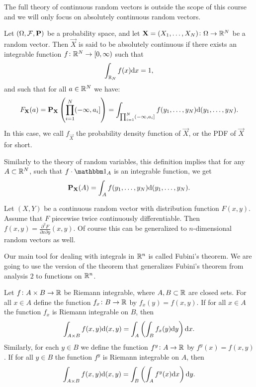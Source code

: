 \documentclass[11pt,a4paper]{article}
\begin{document}
\begin{remark}
  The full theory of continuous random vectors is outside the scope of this
  course and we will only focus on absolutely continuous random vectors.
\end{remark}

\begin{definition}
  Let $(\Omega, \mathcal F, \mathbf{P})$ be a probability space, 
  and let $\boldsymbol{\mathbf{X}} = (X_1,\dots,X_N) \colon \Omega \to \mathbb{R}^N$ be a random vector.
  Then $\vec{X}$ is said to be absolutely continuous if there
  exists an integrable 
  function $f \colon \mathbb{R}^N \to [0,\infty)$ such that 
  \[
    \int_{\R_N} f(x) \dx = 1,
  \]
  and such that for all $a \in \mathbb{R}^N$ we have:
  \[
    F_{\boldsymbol{\mathbf{X}}}(a) = 
    \mathbf{P}_{\boldsymbol{\mathbf{X}}}\left(\prod_{i=1}^{N} (-\infty,a_i]\right) =
    \int_{\prod_{i=1}^{N} (-\infty,a_i]} f(y_1,\dots,y_N)\mathrm{d} (y_1,\dots,y_N).
  \]
  In this case, we call $f_{\vec{X}}$ the probability density function of 
  $\vec{X}$, or the PDF of $\vec X$ for short.
\end{definition}

\begin{remark}
  Similarly to the theory of random variables,
  this definition implies that for any $A \subset \mathbb{R}^N$,
  such that $f \cdot \ind_A$ is an integrable function,
  we get
  \[
    \mathbf{P}_{\boldsymbol{\mathbf{X}}}(A) = 
    \int_{A} f(y_1,\dots,y_N)\mathrm{d} (y_1,\dots,y_N).
  \]
\end{remark}

\begin{remark}
  Let $(X,Y)$ be a continuous random vector with distribution function $F(x,y)$.
  Assume that $F$ piecewise twice continuously differentiable.
  Then $f(x,y) = \frac{\partial^2 F}{\partial x \partial y}(x,y)$.
  Of course this can be generalized to $n$-dimensional random vectors
  as well.
\end{remark}

\begin{remark}
  Our main tool for dealing with integrals in $\mathbb{R}^n$ is called
  Fubini's theorem.
  We are going to use the version of the theorem that generalizes
  Fubini's theorem from analysis $2$ to functions on $\mathbb{R}^n$.
\end{remark}

\begin{theorem}
  Let $f \colon A \times B \to \mathbb{R}$ be Riemann integrable, where 
  $A,B \subset \mathbb{R}$ are closed sets.
  For all $x \in A$ define the function $f_x \colon B \to \mathbb{R}$ by
  $f_x(y) = f(x,y)$.
  If for all $x \in A$ the function $f_x$ is Riemann integrable on $B$,
  then
  \[
    \int_{A \times B} f(x,y) \dif (x,y) =
    \int_{A}\left(\int_{B} f_x(y) \dy\right) \dx.
  \]
  Similarly, for each $y \in B$ we define the function 
  $f^y \colon A \to \mathbb{R}$ by $f^y(x) = f(x,y)$.
  If for all $y \in B$ the function $f^y$ is Riemann integrable on $A$,
  then
  \[
    \int_{A \times B} f(x,y) \dif(x,y) =
    \int_{B}\left(\int_{A} f^y(x) \dx\right) \dy.
  \]
\end{theorem}
\end{document}
